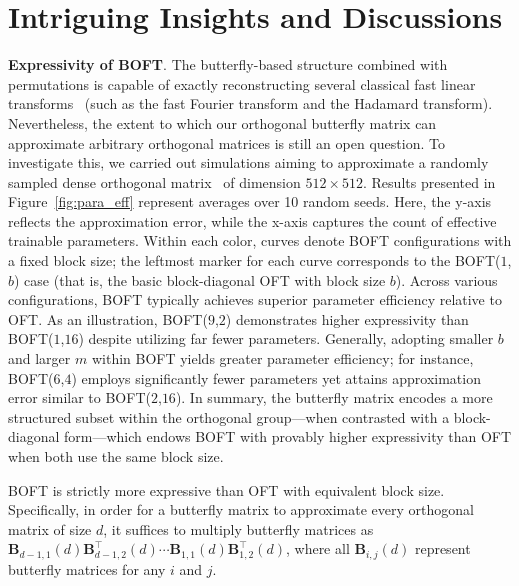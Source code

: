 \section{Intriguing Insights and Discussions}

\textbf{Expressivity of BOFT}. The butterfly-based structure combined with permutations is capable of exactly reconstructing several classical fast linear transforms~\cite{dao2019learning,dao2019kaleidoscope} (such as the fast Fourier transform and the Hadamard transform). Nevertheless, the extent to which our orthogonal butterfly matrix can approximate arbitrary orthogonal matrices is still an open question. To investigate this, we carried out simulations aiming to approximate a randomly sampled dense orthogonal matrix~\cite{anderson1987generation} of dimension $512\times 512$. Results presented in Figure~\ref{fig:para_eff} represent averages over 10 random seeds. Here, the y-axis reflects the approximation error, while the x-axis captures the count of effective trainable parameters. Within each color, curves denote BOFT configurations with a fixed block size; the leftmost marker for each curve corresponds to the BOFT($1$,$b$) case (that is, the basic block-diagonal OFT with block size $b$). Across various configurations, BOFT typically achieves superior parameter efficiency relative to OFT. As an illustration, BOFT($9$,$2$) demonstrates higher expressivity than BOFT($1$,$16$) despite utilizing far fewer parameters. Generally, adopting smaller $b$ and larger $m$ within BOFT yields greater parameter efficiency; for instance, BOFT($6$,$4$) employs significantly fewer parameters yet attains approximation error similar to BOFT($2$,$16$). In summary, the butterfly matrix encodes a more structured subset within the orthogonal group—when contrasted with a block-diagonal form—which endows BOFT with provably higher expressivity than OFT when both use the same block size.

\begin{theorem}\label{thm:exp_boft}
    BOFT is strictly more expressive than OFT with equivalent block size. Specifically, in order for a butterfly matrix to approximate every orthogonal matrix of size $d$, it suffices to multiply butterfly matrices as $\bm{B}_{d-1,1}(d)\bm{B}^\top_{d-1,2}(d)\cdots\bm{B}_{1,1}(d)\bm{B}^\top_{1,2}(d)$, where all $\bm{B}_{i,j}(d)$ represent butterfly matrices for any $i$ and $j$.
\end{theorem}

